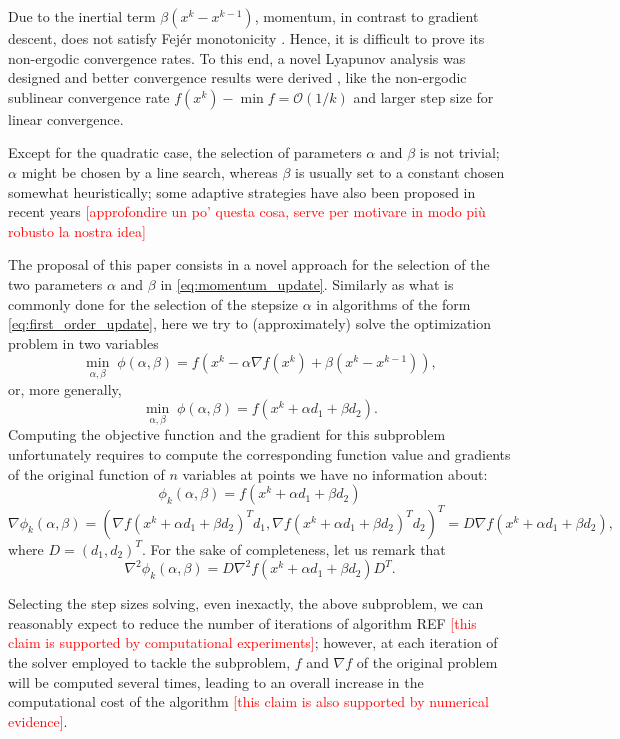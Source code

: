 \documentclass[a4paper, 11pt, openany]{article}
\theoremstyle{plain}%
\theoremstyle{definition}
\begin{document}
	Due to the inertial term $\beta(x^{k} - x^{k-1})$, momentum, in contrast to gradient descent, does not satisfy Fejér monotonicity \cite{Combettes2009}. Hence, it is difficult to prove its non-ergodic convergence rates. To this end, a novel Lyapunov analysis was designed and better convergence results were derived \cite{sun2019non}, like the non-ergodic sublinear convergence rate $f(x^k) - \min f = \mathcal{O}(1/k)$ and larger step size for linear convergence.
	
	Except for the quadratic case, the selection of parameters $\alpha$ and $\beta$ is not trivial; $\alpha$ might be chosen by a line search, whereas $\beta$ is usually set to a constant chosen somewhat heuristically; some adaptive strategies have also been proposed in recent years \textcolor{red}{[approfondire un po' questa cosa, serve per motivare in modo più robusto la nostra idea]}
		
	The proposal of this paper consists in a novel approach for the selection of the two parameters $\alpha$ and $\beta$ in \eqref{eq:momentum_update}. Similarly as what is commonly done for the selection of the stepsize $\alpha$ in algorithms of the form \eqref{eq:first_order_update}, here we try to (approximately) solve the optimization problem in two variables
	$$\min_{\alpha,\beta}\;\phi(\alpha,\beta) = f(x^k -\alpha \nabla f(x^k) + \beta (x^{k}-x^{k-1})),$$
	or, more generally,
	$$\min_{\alpha,\beta}\;\phi(\alpha,\beta) = f(x^k +\alpha d_1 + \beta d_2).$$
	Computing the objective function and the gradient for this subproblem unfortunately requires to compute the corresponding function value and gradients of the original function of $n$ variables at points we have no information about:
	$$\phi_k(\alpha,\beta) = f(x^k +\alpha d_1 + \beta d_2)$$
	$$\nabla \phi_k(\alpha,\beta) = (\nabla f(x^k +\alpha d_1 + \beta d_2)^Td_1,\nabla f(x^k +\alpha d_1 + \beta d_2)^Td_2)^T= D\nabla f(x^k +\alpha d_1 + \beta d_2),$$
	where $D=(d_1,d_2)^T$.
	For the sake of completeness, let us remark that
	$$\nabla^2\phi_k(\alpha,\beta) = D\nabla^2f(x^k +\alpha d_1 + \beta d_2)D^T.$$
	
	Selecting the step sizes solving, even inexactly, the above subproblem, we can reasonably expect to reduce the number of iterations of algorithm REF \textcolor{red}{[this claim is supported by computational experiments]}; however, at each iteration of the solver employed to tackle the subproblem, $f$ and $\nabla f$ of the original problem will be computed several times, leading to an overall increase in the computational cost of the algorithm \textcolor{red}{[this claim is also supported by numerical evidence]}.
 	
\end{document}
